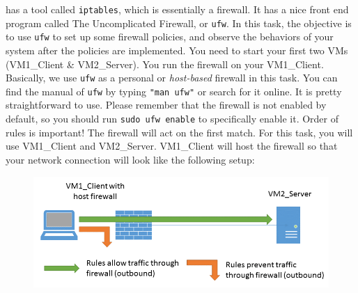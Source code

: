 \linux has a tool called {\tt iptables}, which is essentially a firewall. It has a nice front end program called The Uncomplicated Firewall, or {\tt ufw}. In this task, the objective is to use {\tt ufw} to set up some firewall policies, and 
observe the behaviors of your system after the policies are implemented.
You need to start your first two VMs (VM1\_Client \& VM2\_Server). You run the firewall on your VM1\_Client. Basically, we use 
{\tt ufw} as a personal or {\em host-based} firewall in this task. 
You can find the manual of {\tt ufw} by typing {\tt "man ufw"} or search for it
online. It is pretty straightforward to use. Please remember that the
firewall is not enabled by default, so you should run {\tt sudo ufw enable} to 
specifically enable it. %
Order of rules is important! The firewall will act on the first match. For this task, you will use VM1\_Client and VM2\_Server. VM1\_Client will host the firewall so that your network connection will look like the following setup:
\begin{figure}[htb]
        \centering
        \includegraphics*[width=.9\textwidth]{Figs/firewall.png}
\end{figure}

